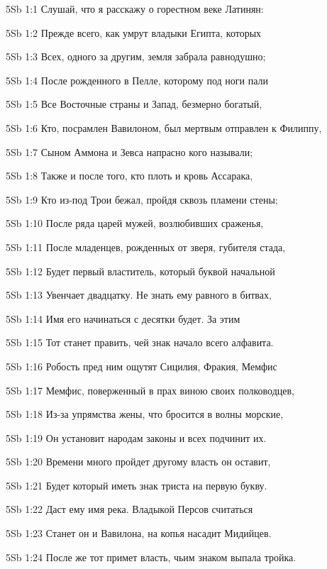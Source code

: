 \vs 5Sb 1:1 Слушай, что я расскажу о горестном веке Латинян: 

\vs 5Sb 1:2 Прежде всего, как умрут владыки Египта, которых 

\vs 5Sb 1:3 Всех, одного за другим, земля забрала равнодушно; 

\vs 5Sb 1:4 После рожденного в Пелле, которому под ноги пали

\vs 5Sb 1:5 Все Восточные страны и Запад, безмерно богатый, 

\vs 5Sb 1:6 Кто, посрамлен Вавилоном, был мертвым отправлен к Филиппу,

\vs 5Sb 1:7 Сыном Аммона и Зевса напрасно кого называли; 

\vs 5Sb 1:8 Также и после того, кто плоть и кровь Ассарака, 

\vs 5Sb 1:9 Кто из-под Трои бежал, пройдя сквозь пламени стены;

\vs 5Sb 1:10 После ряда царей  мужей, возлюбивших сраженья, 

\vs 5Sb 1:11 После младенцев, рожденных от зверя, губителя стада, 

\vs 5Sb 1:12 Будет первый властитель, который буквой начальной 

\vs 5Sb 1:13 Увенчает двадцатку. Не знать ему равного в битвах, 

\vs 5Sb 1:14 Имя его начинаться с десятки будет. За этим

\vs 5Sb 1:15 Тот станет править, чей знак  начало всего алфавита. 

\vs 5Sb 1:16 Робость пред ним ощутят Сицилия, Фракия, Мемфис  

\vs 5Sb 1:17 Мемфис, поверженный в прах виною своих полководцев, 

\vs 5Sb 1:18 Из-за упрямства жены, что бросится в волны морские,  

\vs 5Sb 1:19 Он установит народам законы и всех подчинит их. 

\vs 5Sb 1:20 Времени много пройдет  другому власть он оставит, 

\vs 5Sb 1:21 Будет который иметь знак триста на первую букву. 

\vs 5Sb 1:22 Даст ему имя река. Владыкой Персов считаться 

\vs 5Sb 1:23 Станет он и Вавилона, на копья насадит Мидийцев. 

\vs 5Sb 1:24 После же тот примет власть, чьим знаком выпала тройка.

